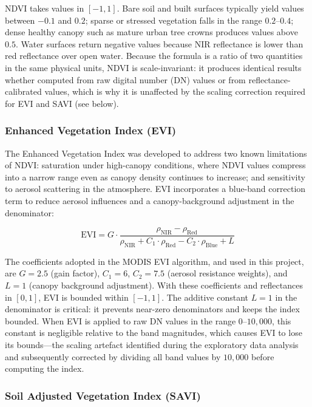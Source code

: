 NDVI takes values in $[-1, 1]$. Bare soil and built surfaces typically yield values between $-0.1$ and $0.2$; sparse or stressed vegetation falls in the range $0.2$--$0.4$; dense healthy canopy such as mature urban tree crowns produces values above $0.5$. Water surfaces return negative values because NIR reflectance is lower than red reflectance over open water. Because the formula is a ratio of two quantities in the same physical units, NDVI is scale-invariant: it produces identical results whether computed from raw digital number (DN) values or from reflectance-calibrated values, which is why it is unaffected by the scaling correction required for EVI and SAVI (see below).

\subsubsection*{Enhanced Vegetation Index (EVI)}
The Enhanced Vegetation Index \cite{huete2002} was developed to address two known limitations of NDVI: saturation under high-canopy conditions, where NDVI values compress into a narrow range even as canopy density continues to increase; and sensitivity to aerosol scattering in the atmosphere. EVI incorporates a blue-band correction term to reduce aerosol influences and a canopy-background adjustment in the denominator:

\begin{equation}
    \text{EVI} = G \cdot
        \frac{\rho_{\text{NIR}} - \rho_{\text{Red}}}
             {\rho_{\text{NIR}} + C_1 \cdot \rho_{\text{Red}}
              - C_2 \cdot \rho_{\text{Blue}} + L}
    \label{eq:evi}
\end{equation}

The coefficients adopted in the MODIS EVI algorithm, and used in this project, are $G = 2.5$ (gain factor), $C_1 = 6$, $C_2 = 7.5$ (aerosol resistance weights), and $L = 1$ (canopy background adjustment). With these coefficients and reflectances in $[0, 1]$, EVI is bounded within $[-1, 1]$. The additive constant $L = 1$ in the denominator is critical: it prevents near-zero denominators and keeps the index bounded. When EVI is applied to raw DN values in the range $0$--$10{,}000$, this constant is negligible relative to the band magnitudes, which causes EVI to lose its bounds---the scaling artefact identified during the exploratory data analysis and subsequently corrected by dividing all band values by $10{,}000$ before computing the index.

\subsubsection*{Soil Adjusted Vegetation Index (SAVI)}

